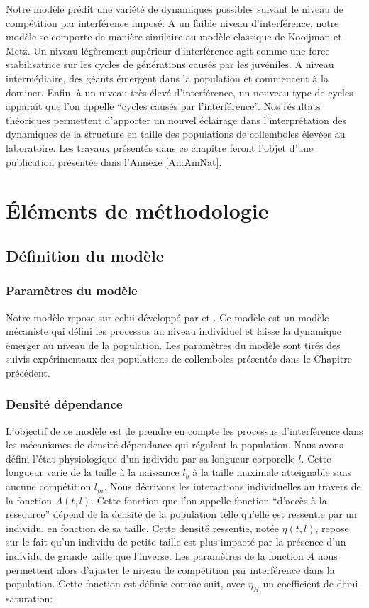 Notre modèle prédit une variété de dynamiques possibles suivant le niveau de
compétition par interférence imposé. A un faible niveau d'interférence, notre
modèle se comporte de manière similaire au modèle classique de Kooijman et Metz.
Un niveau légèrement supérieur d'interférence agit comme une force
stabilisatrice sur les cycles de générations causés par les juvéniles. A niveau intermédiaire, des
géants émergent dans la population et commencent à la dominer. Enfin, à un
niveau très élevé d'interférence, un nouveau type de cycles apparaît que l'on
appelle ``cycles causés par l'interférence''. Nos résultats théoriques
permettent d'apporter un nouvel éclairage dans l'interprétation des dynamiques de la
structure en taille des populations de collemboles élevées au laboratoire. Les
travaux présentés dans ce chapitre feront l'objet d'une publication présentée
dans l'Annexe \ref{An:AmNat}.

\section{Éléments de méthodologie}


\subsection{Définition du modèle}

\subsubsection{Paramètres du modèle}

Notre modèle repose sur celui développé par
\textcites[KM-model][]{kooijman1984a} et \textcites{de-roos1992a}. Ce modèle
est un modèle mécaniste qui défini les processus au niveau individuel et laisse
la dynamique émerger au niveau de la population. Les paramètres du
modèle sont tirés des suivis expérimentaux des populations de collemboles
présentés dans le Chapitre précédent. 


\subsubsection{Densité dépendance}

L'objectif de ce modèle est de prendre en compte les
processus d'interférence dans les mécanismes de densité dépendance qui régulent la population. Nous avons
défini l'état physiologique d'un individu par sa longueur corporelle $l$. Cette
longueur varie de la taille à la naissance $l_b$ à la taille maximale atteignable
sans aucune compétition $l_m$. Nous décrivons les interactions individuelles au
travers de la fonction $A(t,l)$. Cette fonction que l'on appelle fonction
``d'accès à la ressource'' dépend de la densité de la population telle qu'elle
est ressentie par un individu, en fonction de sa taille. Cette densité
ressentie, notée $\eta (t,l)$, repose sur le fait qu'un individu de petite taille est plus
impacté par la présence d'un individu de grande taille que l'inverse. Les
paramètres de la fonction $A$ nous permettent alors d'ajuster le niveau de
compétition par interférence dans la population. Cette fonction est définie
comme suit, avec $\eta _H$ un coefficient de demi-saturation:

